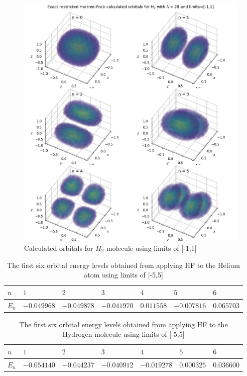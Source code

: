 \documentclass[10pt, oneside, letterpaper]{article}
\begin{document}
\begin{figure}[H]
  \begin{center}
    \includegraphics[scale=0.75]{h2_N28_l1.png}
  \end{center}
  \caption{Calculated orbitals for $H_2$ molecule using limits of [-1,1]}
  \label{h2-plot-l1}
\end{figure}

\begin{table}[H]
\begin{center}
\begin{tabular}{l|llllll}\hline
$n$    & $1$    & $2$     & $3$     & $4$      & $5$      & $6$      \\\hline
$E_n$  & $-0.049968$  & $-0.049878$  & $-0.041970$  & $0.011558$  & $-0.007816$  & $0.065703$ \\\hline
\end{tabular}
\end{center}
  \caption{The first six orbital energy levels obtained from applying HF to the Helium atom using limits of [-5,5]}
  \label{orbital-energies-he-l5}
\end{table}

\begin{table}[H]
\begin{center}
\begin{tabular}{l|llllll}\hline
$n$    & $1$    & $2$     & $3$     & $4$      & $5$      & $6$      \\\hline
$E_n$  & $-0.054140$  & $-0.044237$  & $-0.040912$  & $-0.019278$  & $0.000325$  & $0.036600$ \\\hline
\end{tabular}
\end{center}
  \caption{The first six orbital energy levels obtained from applying HF to the Hydrogen molecule using limits of [-5,5]}
  \label{orbital-energies-h2-l5}
\end{table}
 
\end{document}
